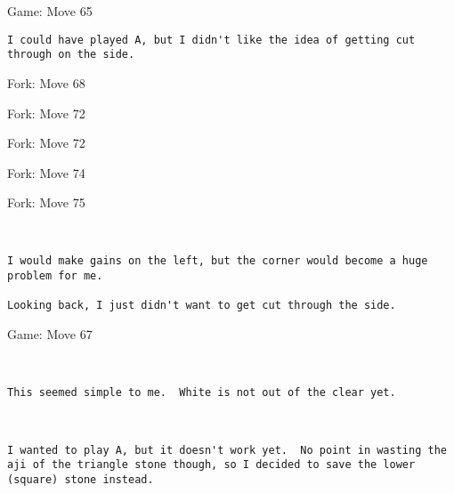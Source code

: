 \documentclass{article}
\begin{document}
\begin{section}{Game: Move 65}
\begin{center}
\begin{lstlisting}
I could have played A, but I didn't like the idea of getting cut through on the side.\end{lstlisting}
\end{center}
\end{section}
\begin{subsection}{Fork: Move 68}
\end{subsection}
\begin{subsection}{Fork: Move 72}
\end{subsection}
\begin{subsection}{Fork: Move 72}
\end{subsection}
\begin{subsection}{Fork: Move 74}
\end{subsection}
\begin{subsection}{Fork: Move 75}
\begin{center}
\cleargoban
{}
\showfullgoban
\\\begin{lstlisting}
I would make gains on the left, but the corner would become a huge problem for me.

Looking back, I just didn't want to get cut through the side.\end{lstlisting}
\end{center}
\end{subsection}
\newpage
\begin{section}{Game: Move 67}
\begin{center}
\cleargoban
{}
\showfullgoban
\\\begin{lstlisting}
This seemed simple to me.  White is not out of the clear yet.\end{lstlisting}
\end{center}
\begin{center}
\cleargoban
{}
\showfullgoban
\\\begin{lstlisting}
I wanted to play A, but it doesn't work yet.  No point in wasting the aji of the triangle stone though, so I decided to save the lower (square) stone instead.\end{lstlisting}
\end{center}
\end{section}
\end{document}
